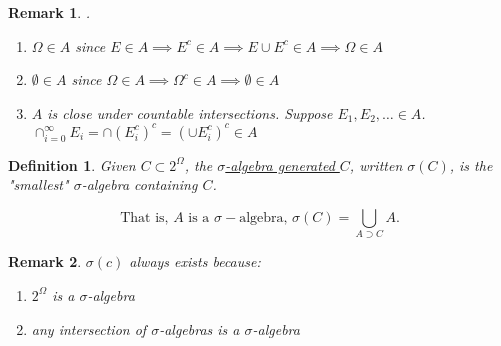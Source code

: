 \documentclass{article}
\newtheorem{definition}{Definition}
\newtheorem{remark}{Remark}
\begin{document}
\begin{remark}
    .
\begin{enumerate}
    \item $\Omega \in A$ since $E \in A \implies E^c \in A \implies E \cup E^c \in A \implies \Omega \in A$
    \item $\emptyset \in A$ since $\Omega \in A \implies \Omega^c \in A \implies \emptyset \in A$
    \item $A$ is close under countable intersections. Suppose $E_1, E_2, \dots \in A$. \\
        $\cap_{i=0}^{\infty}E_i = \cap (E_i^c)^c = (\cup E_i^c)^c \in A$
\end{enumerate}
\end{remark}

\begin{definition}
    \label{def:sigma-algebra-generated-c}
    Given $C \subset 2^\Omega$, the  \underline{$\sigma$-algebra generated $C$}, written $\sigma(C)$, is the "smallest" $\sigma$-algebra containing  $C$.
\end{definition}
\[
    \text{That is, } A \text{ is a } \sigma-\text{algebra, } \sigma\left( C \right) = \bigcup_{A \supset C} A 
.\] 

\begin{remark}
    $\sigma(c)$ always exists because: 
     \begin{enumerate}
         \item $2^\Omega$  is a $\sigma$-algebra
         \item any intersection of  $\sigma$-algebras is a  $\sigma$-algebra
     \end{enumerate}
    
\end{remark}
  
\end{document}
